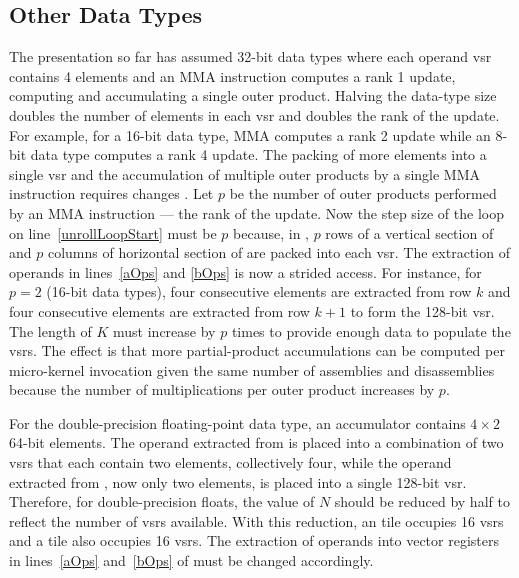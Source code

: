 \documentclass[\main/thesis.tex]{subfiles}
\begin{document}
\subsection{Other Data Types}
\label{sec:dataTypes}
The presentation so far has assumed 32-bit data types where each operand \gls{vsr} contains 4 elements and an MMA instruction computes a rank 1 update, computing and accumulating a single outer product.
Halving the data-type size doubles the number of elements in each \gls{vsr} and doubles the rank of the update.
For example, for a 16-bit data type, MMA computes a rank 2 update while an 8-bit data type computes a rank 4 update.
The packing of more elements into a single \gls{vsr} and the accumulation of multiple outer products by a single MMA instruction requires changes .
Let $p$ be the number of outer products performed by an MMA instruction --- \ie the rank of the update.
Now the step size of the loop on line~\ref{unrollLoopStart} must be $p$ because, in , $p$ rows of a vertical section of  and $p$ columns of horizontal section of  are packed into each \gls{vsr}.
The extraction of operands in lines~\ref{aOps} and \ref{bOps} is now a strided access.
For instance, for $p=2$ (16-bit data types), four consecutive elements are extracted from row $k$ and four consecutive elements are extracted from row $k+1$ to form the 128-bit \gls{vsr}.
The length of $K$ must increase by $p$ times to provide enough data to populate the \glspl{vsr}.
The effect is that more partial-product accumulations can be computed per micro-kernel invocation given the same number of assemblies and disassemblies because the number of multiplications per outer product increases by $p$.

For the double-precision floating-point data type, an accumulator contains $4 \times 2$ 64-bit elements.
The operand extracted from  is placed into a combination of two \glspl{vsr} that each contain two elements, collectively four, while the operand extracted from , now only two elements, is placed into a single 128-bit \gls{vsr}.
Therefore, for double-precision floats, the value of $N$ should be reduced by half to reflect the number of \glspl{vsr} available.
With this reduction, an  tile occupies 16 \glspl{vsr} and a  tile also occupies 16 \glspl{vsr}.
The extraction of operands into vector registers in lines~\ref{aOps} and~\ref{bOps} of  must be changed accordingly.
\end{document}
